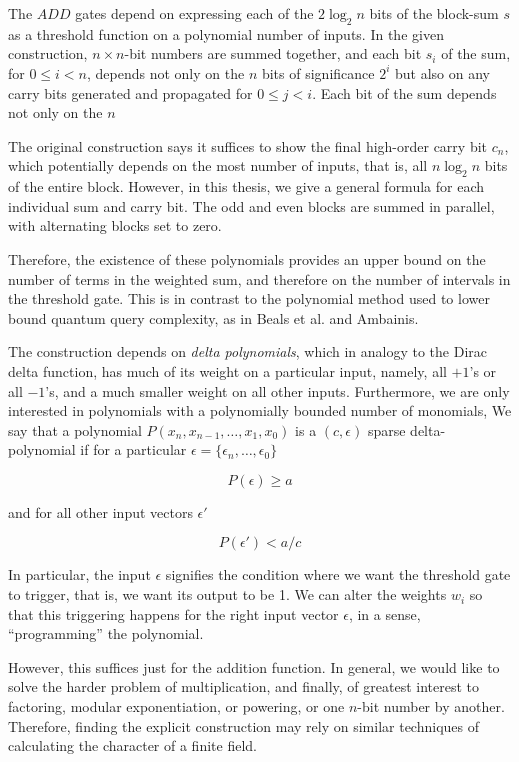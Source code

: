 \documentclass{article}
\begin{document}
The $ADD$ gates depend on expressing each of the $2\log_2 n$ bits of
the block-sum $s$ as a threshold function on a polynomial number of inputs.
In the given construction, $n\times n$-bit numbers are summed together,
and each bit $s_i$ of the sum, for $0 \le i < n$,
depends not only on the $n$ bits of significance
$2^i$ but also on any carry bits generated and propagated for $0 \le j < i$.
Each bit of the sum depends not only on the $n$

The original construction says it suffices to show the final high-order
carry bit $c_n$, which potentially depends on the most number of inputs,
that is, all $n \log_2 n$ bits of the entire block. However, in this thesis,
we give a general formula for each individual sum and carry bit. The odd
and even blocks are summed in parallel, with alternating blocks set to zero.

Therefore, the existence of these polynomials provides an upper bound on
the number of terms in the weighted sum, and therefore on the number of
intervals in the threshold gate. This is in contrast to the polynomial method
used to lower bound quantum query complexity, as in Beals et al. and 
Ambainis.

The construction depends on \emph{delta polynomials}, which in analogy to the
Dirac delta function, has much of its weight on a particular input, namely,
all $+1$'s or all $-1$'s, and a much smaller weight on all other inputs.
Furthermore, we are only interested in polynomials with a polynomially
bounded number of monomials, 
We say that a polynomial $P(x_n, x_{n-1}, \ldots, x_1, x_0)$ is a
$(c,\epsilon)$ sparse delta-polynomial if for a particular
$\epsilon = \{\epsilon_n, \ldots, \epsilon_0\}$

\begin{equation}
P(\epsilon) \ge a
\end{equation}

and for all other input vectors $\epsilon'$

\begin{equation}
P(\epsilon') < a/c
\end{equation}

In particular, the input $\epsilon$ signifies the condition where we want
the threshold gate to trigger, that is, we want its output to be 1. We can
alter the weights $w_i$ so that this triggering happens for the right
input vector $\epsilon$, in a sense, ``programming'' the polynomial.

However, this suffices just for the addition function. In general, we would
like to solve the harder problem of multiplication, and finally, of greatest
interest to factoring, modular exponentiation, or powering, or one $n$-bit number
by another. Therefore, finding the explicit construction may rely on
similar techniques of calculating the character of a finite field.
\end{document}
